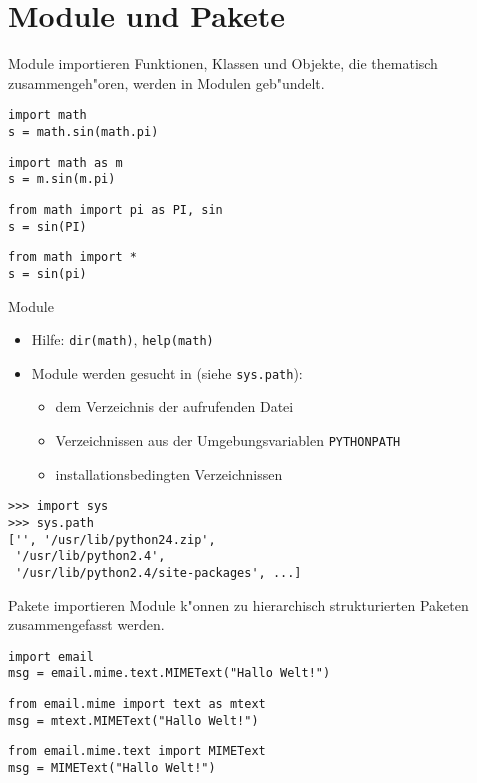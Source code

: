 \section{Module und Pakete}

\begin{frame}[fragile]{Module importieren}
Funktionen, Klassen und Objekte, die thematisch zusammengeh"oren, werden in Modulen geb"undelt.
\begin{lstlisting}[style=Python]
import math
s = math.sin(math.pi)
\end{lstlisting}
\begin{lstlisting}[style=Python]
import math as m
s = m.sin(m.pi)
\end{lstlisting}
\begin{lstlisting}[style=Python]
from math import pi as PI, sin
s = sin(PI)
\end{lstlisting}
\begin{lstlisting}[style=Python]
from math import *
s = sin(pi)
\end{lstlisting}
\end{frame}

\begin{frame}[fragile]{Module}
\begin{itemize}
\item Hilfe: \lstinline{dir(math)}, \lstinline{help(math)}
\item Module werden gesucht in (siehe \lstinline{sys.path}):
\begin{itemize}
\item dem Verzeichnis der aufrufenden Datei
\item Verzeichnissen aus der Umgebungsvariablen \texttt{PYTHONPATH}
\item installationsbedingten Verzeichnissen 
\end{itemize}
\end{itemize}
\begin{lstlisting}[style=Shell]
>>> import sys
>>> sys.path
['', '/usr/lib/python24.zip',
 '/usr/lib/python2.4', 
 '/usr/lib/python2.4/site-packages', ...]
\end{lstlisting}
\end{frame}

\begin{frame}[fragile]{Pakete importieren}
Module k"onnen zu  hierarchisch strukturierten Paketen zusammengefasst werden.
\begin{lstlisting}[style=Python]
import email
msg = email.mime.text.MIMEText("Hallo Welt!")
\end{lstlisting}
\begin{lstlisting}[style=Python]
from email.mime import text as mtext
msg = mtext.MIMEText("Hallo Welt!")
\end{lstlisting}
\begin{lstlisting}[style=Python]
from email.mime.text import MIMEText
msg = MIMEText("Hallo Welt!")
\end{lstlisting}
\end{frame}

